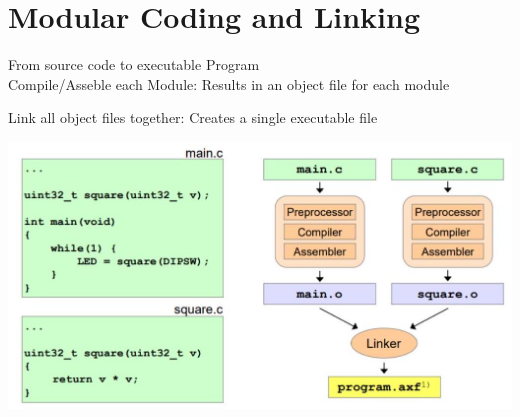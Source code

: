 \section{Modular Coding and Linking}

\begin{definition}{From source code to executable Program}\\
Compile/Asseble each Module:
Results in an object file for each module

Link all object files together:
Creates a single executable file

\includegraphics[width=\linewidth]{images/2024_12_29_79e6b22f503fb7b4f718g-10(2)}
\end{definition}

